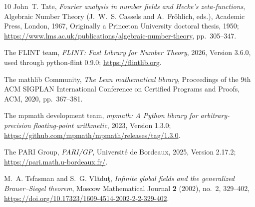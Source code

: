 \documentclass[11pt]{amsart}
\numberwithin{equation}{section}
\theoremstyle{definition}
\theoremstyle{remark}
\begin{document}
\begin{thebibliography}{10}
John~T. Tate, \emph{Fourier analysis in number fields and {Hecke}'s
  zeta-functions}, Algebraic Number Theory (J.~W.~S. Cassels and
  A.~Fr{\"o}hlich, eds.), Academic Press, London, 1967, Originally a Princeton
  University doctoral thesis, 1950;
  \url{https://www.lms.ac.uk/publications/algebraic-number-theory},
  pp.~305--347.

{The FLINT team}, \emph{{FLINT}: {F}ast {L}ibrary for {N}umber {T}heory}, 2026,
  Version 3.6.0, used through python-flint 0.9.0; \url{https://flintlib.org}.

{The mathlib Community}, \emph{The {Lean} mathematical library}, Proceedings of
  the 9th ACM SIGPLAN International Conference on Certified Programs and
  Proofs, ACM, 2020, pp.~367--381.

{The mpmath development team}, \emph{{mpmath}: A {Python} library for
  arbitrary-precision floating-point arithmetic}, 2023, Version 1.3.0;
  \url{https://github.com/mpmath/mpmath/releases/tag/1.3.0}.

{The PARI Group}, \emph{{PARI/GP}}, Universit{\'e} de Bordeaux, 2025, Version
  2.17.2; \url{https://pari.math.u-bordeaux.fr/}.

M.~A. Tsfasman and S.~G. Vl{\u a}du{\c t}, \emph{Infinite global fields and the
  generalized {Brauer--Siegel} theorem}, Moscow Mathematical Journal \textbf{2}
  (2002), no.~2, 329--402,
  \url{https://doi.org/10.17323/1609-4514-2002-2-2-329-402}.

\end{thebibliography}
\end{document}
